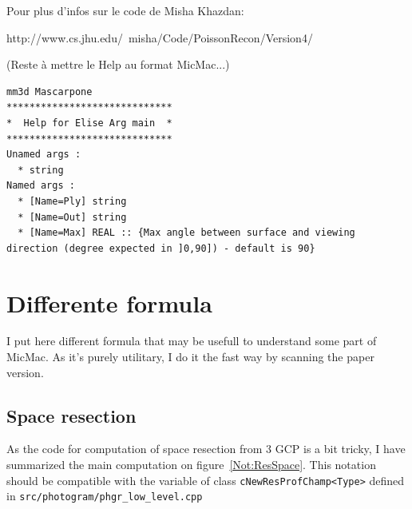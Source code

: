 Pour plus d'infos sur le code de Misha Khazdan:

http://www.cs.jhu.edu/~misha/Code/PoissonRecon/Version4/
	
\vspace{\baselineskip}
(Reste à mettre le Help au format MicMac...)

\begin{verbatim} 
mm3d Mascarpone
*****************************
*  Help for Elise Arg main  *
*****************************
Unamed args :
  * string
Named args :
  * [Name=Ply] string
  * [Name=Out] string
  * [Name=Max] REAL :: {Max angle between surface and viewing direction (degree expected in ]0,90]) - default is 90}
\end{verbatim}


\chapter{Differente formula}

I put here different formula that may be usefull to understand some part of MicMac. As it's purely utilitary, I do it the fast way by
scanning the paper version.

\section{Space resection}


As the code for computation of space resection from $3$ GCP is a bit tricky, I have summarized the main
computation on figure~\ref{Not:ResSpace}. This notation should be compatible with the variable 
of class {\tt cNewResProfChamp<Type>} defined in {\tt src/photogram/phgr\_low\_level.cpp}


